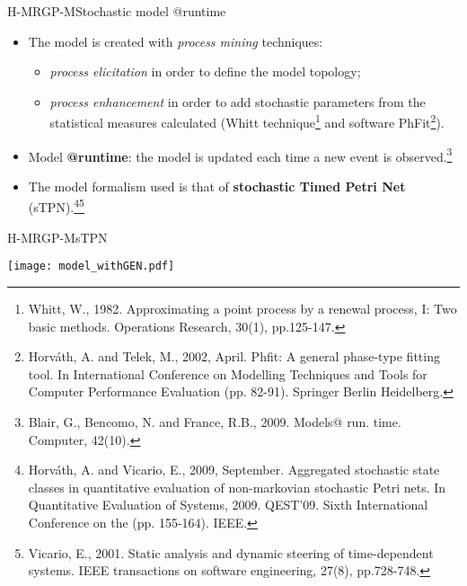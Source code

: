 \documentclass[9pt, handout]{beamer}
\begin{document}
      \begin{frame}{H-MRGP-M}{Stochastic model @runtime}
        \pause
        \begin{itemize}
          \item The model is created with \textit{process mining} techniques:
          \pause
          \begin{itemize}
            \item \textit{process elicitation} in order to define the model topology;
            \pause
            \item \textit{process enhancement} in order to add stochastic parameters from the statistical measures calculated (Whitt technique\footnote{Whitt, W., 1982. Approximating a point process by a renewal process, I: Two basic methods. Operations Research, 30(1), pp.125-147.} and software PhFit\footnote{Horváth, A. and Telek, M., 2002, April. Phfit: A general phase-type fitting tool. In International Conference on Modelling Techniques and Tools for Computer Performance Evaluation (pp. 82-91). Springer Berlin Heidelberg.}).
          \end{itemize}
          \pause
          \item Model \textbf{@runtime}: the model is updated each time a new event is observed.\footnote{Blair, G., Bencomo, N. and France, R.B., 2009. Models@ run. time. Computer, 42(10).}
          \pause
          \item The model formalism used is that of \textbf{stochastic Timed Petri Net} (sTPN).\footnote{Horváth, A. and Vicario, E., 2009, September. Aggregated stochastic state classes in quantitative evaluation of non-markovian stochastic Petri nets. In Quantitative Evaluation of Systems, 2009. QEST'09. Sixth International Conference on the (pp. 155-164). IEEE.}\footnote{Vicario, E., 2001. Static analysis and dynamic steering of time-dependent systems. IEEE transactions on software engineering, 27(8), pp.728-748.}
        \end{itemize}
      \end{frame}
      
      \begin{frame}{H-MRGP-M}{sTPN}
        \begin{center}
          \texttt{[image: model\_withGEN.pdf]}
        \end{center}
      \end{frame}
      
\end{document}
